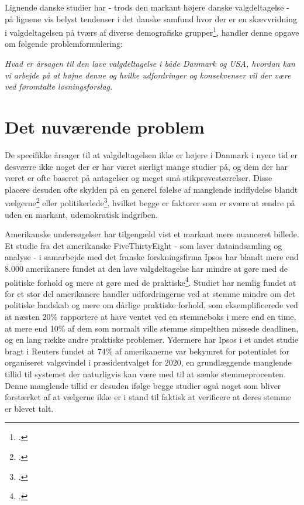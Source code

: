 \documentclass[a4paper, 8pt, oneside]{article} %
\begin{document}
Lignende danske studier har - trods den markant højere danske valgdeltagelse - på lignene vis belyst tendenser i det danske samfund hvor der er en skævvridning i valgdeltagelsen på tværs af diverse demografiske grupper\footcite{bhatti_hvem_2014}, handler denne opgave om følgende problemformulering:\\

\begin{center}
    \textit{\Large Hvad er årsagen til den lave valgdeltagelse i både Danmark og USA, hvordan kan vi arbejde på at højne denne og hvilke udfordringer og konsekvenser vil der være ved føromtalte løsningsforslag.}
\end{center}

\newpage

\section{Det nuværende problem}
De specifikke årsager til at valgdeltagelsen ikke er højere i Danmark i nyere tid er desværre ikke noget der er har været særligt mange studier på, og dem der har været er ofte baseret på antagelser og meget små stikprøvestørrelser. Disse placere desuden ofte skylden på en generel følelse af manglende indflydelse blandt vælgerne\footcite{noauthor_demokratiet_nodate} eller politikerlede\footcite{ejsing_stor_2015}, hvilket begge er faktorer som er svære at ændre på uden en markant, udemokratisk indgriben.

Amerikanske undersøgelser har tilgengæld vist et markant mere nuanceret billede. Et studie fra det amerikanske FiveThirtyEight - som laver dataindsamling og analyse - i samarbejde med det franske forskningsfirma Ipsos har blandt mere end 8.000 amerikanere fundet at den lave valgdeltagelse har mindre at gøre med de politiske forhold og mere at gøre med de praktiske\footcite{noauthor_why_2020}. Studiet har nemlig fundet at for et stor del amerikanere handler udfordringerne ved at stemme mindre om det politiske landskab og mere om dårlige praktiske forhold, som eksemplificerede ved at næsten 20\% rapportere at have ventet ved en stemmeboks i mere end en time, at mere end 10\% af dem som normalt ville stemme simpelthen missede deadlinen, og en lang række andre praktiske problemer. Ydermere har Ipsos i et andet studie bragt i Reuters fundet at 74\% af amerikanerne var bekymret for potentialet for organiseret valgsvindel i præsidentvalget for 2020, en grundlæggende manglende tillid til systemet der naturligvis kan være med til at sænke stemmeprocenten. Denne manglende tillid er desuden ifølge begge studier også noget som bliver forstærket af at vælgerne ikke er i stand til faktisk at verificere at deres stemme er blevet talt.
\end{document}
